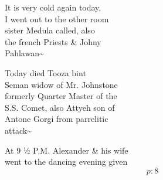 \documentclass{report}
\begin{document}
	\par{
 	It is very cold again today,\ \\I went out to the other room\ \\sister Medula called, also\ \\the french Priests \& Johny\ \\Pahlawan\~{}\ \\
	}

	\par{
 	Today died Tooza bint\ \\Seman widow of Mr. Johnstone\ \\formerly Quarter Master of the\ \\S.S. Comet, also Attyeh son of\ \\Antone Gorgi from parrelitic\ \\attack\~{}\ \\
	}

	\par{
 	At 9 ½ P.M. Alexander \& his wife\ \\went to the dancing evening given\ \\
  \[p: 8 \]

	}

 
 
\end{document}
